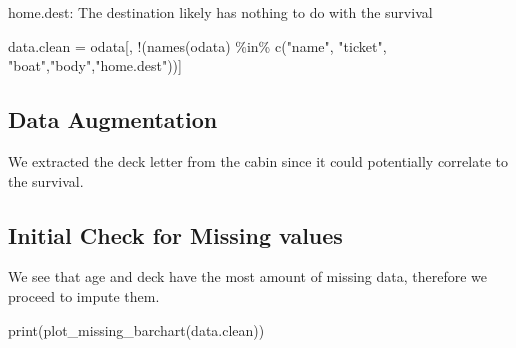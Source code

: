 \documentclass[
  letterpaper,
  DIV=11,
  numbers=noendperiod]{scrartcl}
\newenvironment{Shaded}{\begin{snugshade}}{\end{snugshade}}
\newcommand{\CommentTok}[1]{\textcolor[rgb]{0.37,0.37,0.37}{#1}}
\newcommand{\ConstantTok}[1]{\textcolor[rgb]{0.56,0.35,0.01}{#1}}
\newcommand{\DecValTok}[1]{\textcolor[rgb]{0.68,0.00,0.00}{#1}}
\newcommand{\FunctionTok}[1]{\textcolor[rgb]{0.28,0.35,0.67}{#1}}
\newcommand{\NormalTok}[1]{\textcolor[rgb]{0.00,0.23,0.31}{#1}}
\newcommand{\OtherTok}[1]{\textcolor[rgb]{0.00,0.23,0.31}{#1}}
\newcommand{\SpecialCharTok}[1]{\textcolor[rgb]{0.37,0.37,0.37}{#1}}
\newcommand{\StringTok}[1]{\textcolor[rgb]{0.13,0.47,0.30}{#1}}
\begin{document}
home.dest: The destination likely has nothing to do with the survival

\begin{Shaded}
\begin{Highlighting}[]
\NormalTok{data.clean }\OtherTok{=}\NormalTok{ odata[, }\SpecialCharTok{!}\NormalTok{(}\FunctionTok{names}\NormalTok{(odata) }\SpecialCharTok{\%in\%} \FunctionTok{c}\NormalTok{(}\StringTok{"name"}\NormalTok{, }\StringTok{"ticket"}\NormalTok{, }\StringTok{"boat"}\NormalTok{,}\StringTok{"body"}\NormalTok{,}\StringTok{"home.dest"}\NormalTok{))]}
\end{Highlighting}
\end{Shaded}

\subsection{Data Augmentation}\label{data-augmentation}

We extracted the deck letter from the cabin since it could potentially
correlate to the survival.

\begin{Shaded}
\end{Shaded}

\subsection{Initial Check for Missing
values}\label{initial-check-for-missing-values}

We see that age and deck have the most amount of missing data, therefore
we proceed to impute them.

\begin{Shaded}
\begin{Highlighting}[]
\FunctionTok{print}\NormalTok{(}\FunctionTok{plot\_missing\_barchart}\NormalTok{(data.clean))}
\end{Highlighting}
\end{Shaded}
\end{document}
